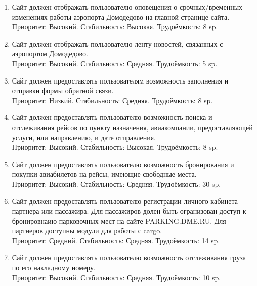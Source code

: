 \begin{enumerate}
      \item Сайт должен отображать пользователю оповещения о
            срочных/временных изменениях работы аэропорта
            Домодедово на главной странице сайта. \\
            Приоритет: Высокий. Стабильность: Высокая. Трудоёмкость: 8 sp.

      \item Сайт должен отображать пользователю ленту
            новостей, связанных с аэропортом Домодедово. \\
            Приоритет: Высокий. Стабильность: Средняя. Трудоёмкость: 5 sp.

      \item Сайт должен предоставлять пользователям возможность заполнения
            и отправки формы обратной связи. \\
            Приоритет: Низкий. Стабильность: Средняя. Трудоёмкость: 8 sp.

      \item Сайт должен предоставлять пользователю возможность поиска
            и отслеживания рейсов по пункту назначения,
            авиакомпании, предоставляющей услуги, или
            направлению, и дате отправления. \\
            Приоритет: Высокий. Стабильность: Высокая. Трудоёмкость: 8 sp.

      \item Сайт должен предоставлять пользователю возможность бронирования
            и покупки авиабилетов на рейсы, имеющие
            свободные места. \\
            Приоритет: Высокий. Стабильность: Средняя. Трудоёмкость: 30 sp.

      \item Сайт должен предоставлять пользователю
            регистрации личного кабинета партнера или
            пассажира. Для пассажиров долен быть
            огранизован доступ к бронировнаию парковочных
            мест на сайте PARKING.DME.RU. Для партнеров
            доступны модули для работы с cargo. \\
            Приоритет: Средний. Стабильность: Средняя. Трудоёмкость: 14 sp.

      \item Сайт должен предоставлять пользователю возможность
            отслеживания груза по его накладному номеру. \\
            Приоритет: Высокий. Стабильность: Средняя. Трудоёмкость: 10 sp.


\end{enumerate}

